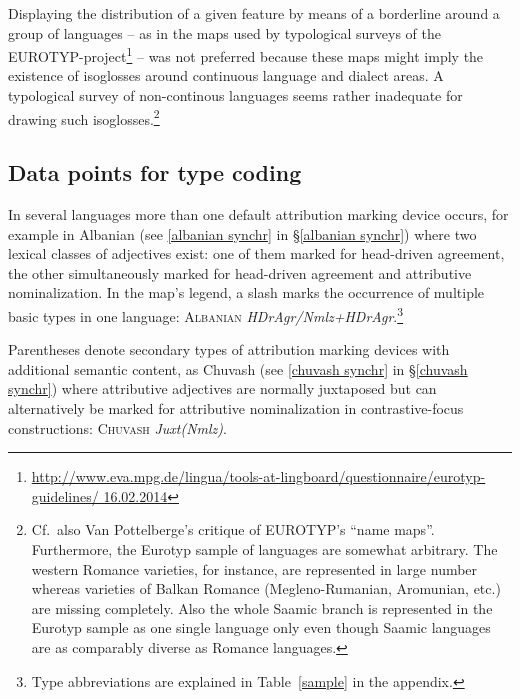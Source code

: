 Displaying the distribution of a given feature by means of a borderline around a group of languages – as in the maps used by typological surveys of the EUROTYP-project\footnote{\url{http://www.eva.mpg.de/lingua/tools-at-lingboard/questionnaire/eurotyp-guidelines/ 16.02.2014}} – was not preferred because these maps might imply the existence of isoglosses around continuous language and dialect areas. A typological survey of non-continous languages seems rather inadequate for drawing such isoglosses.\footnote{Cf.~also Van Pottelberge's \citeyear{van-pottelberge2001} critique of EUROTYP's “name maps”. Furthermore, the Eurotyp sample of languages are somewhat arbitrary. The western Romance varieties, for instance, are represented in large number whereas varieties of Balkan Romance (Megleno-Rumanian, Aromunian, etc.) are missing completely. Also the whole Saamic branch is represented in the Eurotyp sample as one single language only even though Saamic languages are as comparably diverse as Romance languages.}

\subsection[Type coding]{Data points for type coding}
In several languages more than one default attribution marking device occurs, for example in Albanian (see \ref{albanian synchr} in \S\ref{albanian synchr}) where two lexical classes of adjectives exist: one of them marked for head-driven agreement, the other simultaneously marked for head-driven agreement and attributive nominalization. In the map's legend, a slash marks the occurrence of multiple basic types in one language: \textsc{Albanian} \textit{HDrAgr/Nmlz+HDrAgr}.\footnote{Type abbreviations are explained in Table~\ref{sample} in the appendix.}

Parentheses denote secondary types of attribution marking devices with additional semantic content, as Chuvash (see \ref{chuvash synchr} in \S\ref{chuvash synchr}) where attributive adjectives are normally juxtaposed but can alternatively be marked for attributive nominalization in contrastive-focus constructions: \textsc{Chuvash} \textit{Juxt(Nmlz)}.

